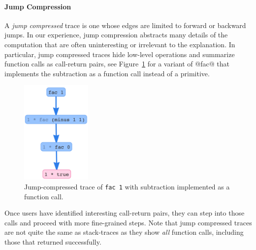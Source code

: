 \paragraph{Jump Compression}
%
A \emph{jump compressed} trace is one whose edges are limited to forward
or backward jumps.
%
In our experience, jump compression abstracts many details of the
computation that are often uninteresting or irrelevant to the
explanation.
%
In particular, jump compressed traces hide low-level operations and
summarize function calls as call-return pairs, see
Figure~\ref{fig:fac-jump} for a variant of @fac@ that implements the
subtraction as a function call instead of a primitive.
%
\begin{figure}[t]
\centering
\includegraphics[height=2in]{fac-minus.png}
\caption{Jump-compressed trace of \texttt{fac 1} with subtraction
  implemented as a function call.}
\label{fig:fac-jump}
\end{figure}
%
Once users have identified interesting call-return pairs, they can
step into those calls and proceed with more fine-grained steps.
%
%
Note that jump compressed traces are not quite the same as
stack-traces as they show \emph{all} function calls, including
those that returned successfully.
%



